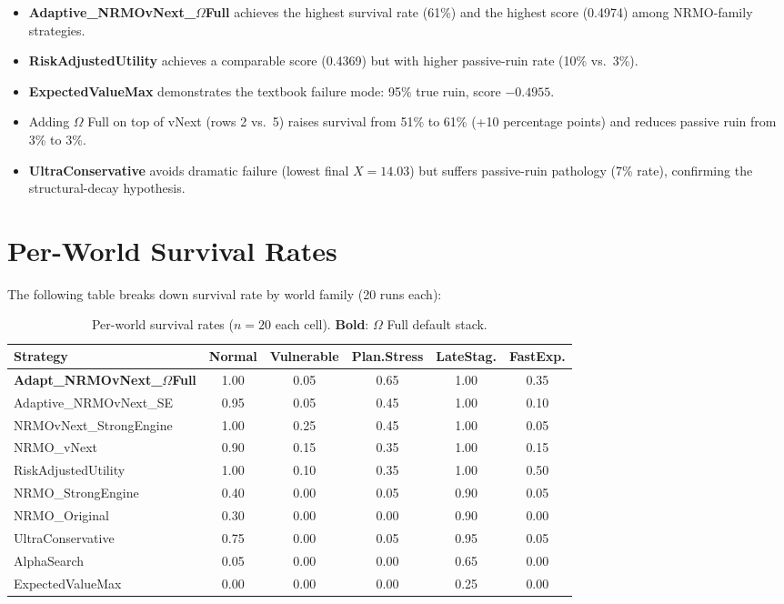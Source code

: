 \begin{itemize}
\item \textbf{Adaptive\_NRMOvNext\_$\Omega$Full} achieves the
highest survival rate (61\%) and the highest score (0.4974) among
NRMO-family strategies.
\item \textbf{RiskAdjustedUtility} achieves a comparable score
(0.4369) but with higher passive-ruin rate (10\% vs.~3\%).
\item \textbf{ExpectedValueMax} demonstrates the textbook failure
mode: 95\% true ruin, score $-0.4955$.
\item Adding $\Omega$ Full on top of vNext (rows 2 vs.~5) raises
survival from 51\% to 61\% (+10 percentage points) and reduces
passive ruin from 3\% to 3\%.
\item \textbf{UltraConservative} avoids dramatic failure (lowest
final $X = 14.03$) but suffers passive-ruin pathology (7\% rate),
confirming the structural-decay hypothesis.
\end{itemize}

\section{Per-World Survival Rates}
\label{sec:empirical-per-world}

The following table breaks down survival rate by world family
(20 runs each):

\begin{table}[ht]
\centering
\scriptsize
\renewcommand{\arraystretch}{1.05}
\begin{tabularx}{\linewidth}{Xccccc}
\toprule
\textbf{Strategy} & \textbf{Normal} & \textbf{Vulnerable} &
\textbf{Plan.Stress} & \textbf{LateStag.} & \textbf{FastExp.} \\
\midrule
\textbf{Adapt\_NRMOvNext\_$\Omega$Full}
& 1.00 & 0.05 & 0.65 & 1.00 & 0.35 \\
Adaptive\_NRMOvNext\_SE
& 0.95 & 0.05 & 0.45 & 1.00 & 0.10 \\
NRMOvNext\_StrongEngine
& 1.00 & 0.25 & 0.45 & 1.00 & 0.05 \\
NRMO\_vNext
& 0.90 & 0.15 & 0.35 & 1.00 & 0.15 \\
RiskAdjustedUtility
& 1.00 & 0.10 & 0.35 & 1.00 & 0.50 \\
NRMO\_StrongEngine
& 0.40 & 0.00 & 0.05 & 0.90 & 0.05 \\
NRMO\_Original
& 0.30 & 0.00 & 0.00 & 0.90 & 0.00 \\
UltraConservative
& 0.75 & 0.00 & 0.05 & 0.95 & 0.05 \\
AlphaSearch
& 0.05 & 0.00 & 0.00 & 0.65 & 0.00 \\
ExpectedValueMax
& 0.00 & 0.00 & 0.00 & 0.25 & 0.00 \\
\bottomrule
\end{tabularx}
\caption[Per-world survival rates]{Per-world survival rates
($n = 20$ each cell). \textbf{Bold}: $\Omega$ Full default stack.}
\label{tab:empirical-per-world-survival}
\end{table}

